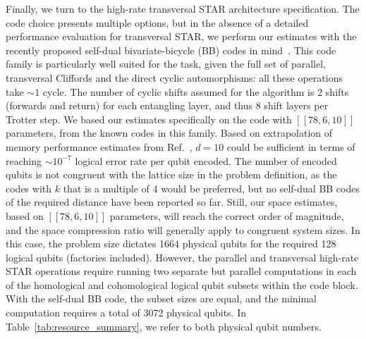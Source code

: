 \documentclass[aps, prx, reprint, superscriptaddress, longbibliography, floatfix]{revtex4-2}
\begin{document}
Finally, we turn to the high-rate transversal STAR architecture specification. The code choice presents multiple options, but in the absence of a detailed performance evaluation for transversal STAR, we perform our estimates with the recently proposed self-dual bivariate-bicycle (BB) codes in mind~\cite{Xu2025batched}. This code family is particularly well suited for the task, given the full set of parallel, transversal Cliffords and the direct cyclic automorphisms: all these operations take $\sim 1$ cycle. The number of cyclic shifts assumed for the algorithm is 2 shifts (forwards and return) for each entangling layer, and thus 8 shift layers per Trotter step. We based our estimates specifically on the code with $[[78,6,10]]$ parameters, from the known codes in this family. Based on extrapolation of memory performance estimates from Ref.~\cite{Xu2025batched}, $d=10$ could be sufficient in terms of reaching $\sim 10^{-7}$ logical error rate per qubit encoded. The number of encoded qubits is not congruent with the lattice size in the problem definition, as the codes with $k$ that is a multiple of 4 would be preferred, but no self-dual BB codes of the required distance have been reported so far. Still, our space estimates, based on $[[78,6,10]]$ parameters, will reach the correct order of magnitude, and the space compression ratio will generally apply to congruent system sizes. In this case, the problem size dictates 1664 physical qubits for the required 128 logical qubits (factories included). However, the parallel and transversal high-rate STAR operations require running two separate but parallel computations in each of the homological and cohomological logical qubit subsets within the code block. With the self-dual BB code, the subset sizes are equal, and the minimal computation requires a total of 3072 physical qubits. In Table~\ref{tab:resource_summary}, we refer to both physical qubit numbers.
\end{document}
